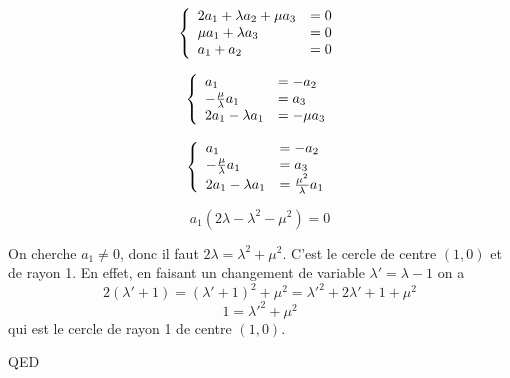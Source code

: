 \documentclass[]{book}
\theoremstyle{definition}
\begin{document}
$$ 
\left\{ 
\begin{array}{l l}
2a_1 + \lambda a_2 + \mu a_3 & = 0\\
\mu a_1 + \lambda a_3 & = 0\\
a_1 + a_2  & = 0\\
\end{array}
\right. 
$$ 

$$ 
\left\{ 
\begin{array}{l l}
a_1  & = - a_2\\
-\frac{\mu}{\lambda}a_1  & =  a_3\\
2a_1 - \lambda a_1 & =  -\mu a_3\\
\end{array}
\right. 
$$ 

$$ 
\left\{ 
\begin{array}{l l}
a_1  & = - a_2\\
-\frac{\mu}{\lambda}a_1  & =  a_3\\
2a_1 - \lambda a_1 & =  \frac{\mu^2}{\lambda}a_1\\
\end{array}
\right. 
$$ 

$$a_1(2\lambda -\lambda^2 - \mu^2) = 0 $$

On cherche $a_1 \neq 0$, donc il faut $2\lambda = \lambda^2 + \mu^2$. C'est le cercle de centre $(1,0)$ et de rayon 1.
En effet, en faisant un changement de variable $\lambda'= \lambda-1$ on a 
$$
2(\lambda'+1) = (\lambda'+1)^2+\mu^2 = \lambda'^2+2\lambda'+1+\mu^2$$
$$1=\lambda'^2+\mu^2$$
qui est le cercle de rayon 1 de centre $(1,0)$.

QED
\end{document}
